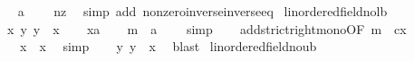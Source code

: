 \begin{isabellebody}
\ \ \isamarkupfalse%
\ {\isachardoublequoteopen}a\ {\isacharless}{\kern0pt}\ {}{\isachardoublequoteclose}\ \isamarkupfalse%
\ nz\ \isamarkupfalse%
\ {\isacharparenleft}{\kern0pt}simp\ add{\isacharcolon}{\kern0pt}\ nonzero{\isacharunderscore}{\kern0pt}inverse{\isacharunderscore}{\kern0pt}inverse{\isacharunderscore}{\kern0pt}eq{\isacharparenright}{\kern0pt}\isanewline
{}\isamarkupfalse%
%
\endisatagproof
{\isafoldproof}%
%
\isadelimproof
\isanewline
%
\endisadelimproof
\isanewline
{}\isamarkupfalse%
\ linordered{\isacharunderscore}{\kern0pt}field{\isacharunderscore}{\kern0pt}no{\isacharunderscore}{\kern0pt}lb{\isacharcolon}{\kern0pt}\isanewline
\ \ {\isachardoublequoteopen}{\isasymforall}x{\isachardot}{\kern0pt}\ {\isasymexists}y{\isachardot}{\kern0pt}\ y\ {\isacharless}{\kern0pt}\ x{\isachardoublequoteclose}\isanewline
%
\isadelimproof
%
\endisadelimproof
%
\isatagproof
{}\isamarkupfalse%
\isanewline
\ \ \isamarkupfalse%
\ x{\isacharcolon}{\kern0pt}{\isacharcolon}{\kern0pt}{\isacharprime}{\kern0pt}a\isanewline
\ \ \isamarkupfalse%
\ m{}{\isacharcolon}{\kern0pt}\ {\isachardoublequoteopen}{\isacharminus}{\kern0pt}\ {\isacharparenleft}{\kern0pt}{}{\isacharcolon}{\kern0pt}{\isacharcolon}{\kern0pt}{\isacharprime}{\kern0pt}a{\isacharparenright}{\kern0pt}\ {\isacharless}{\kern0pt}\ {}{\isachardoublequoteclose}\ \isamarkupfalse%
\ simp\isanewline
\ \ \isamarkupfalse%
\ add{\isacharunderscore}{\kern0pt}strict{\isacharunderscore}{\kern0pt}right{\isacharunderscore}{\kern0pt}mono{\isacharbrackleft}{\kern0pt}OF\ m{}{\isacharcomma}{\kern0pt}\ \ c{\isacharequal}{\kern0pt}x{\isacharbrackright}{\kern0pt}\isanewline
\ \ \isamarkupfalse%
\ {\isachardoublequoteopen}{\isacharparenleft}{\kern0pt}{\isacharminus}{\kern0pt}\ {}{\isacharparenright}{\kern0pt}\ {\isacharplus}{\kern0pt}\ x\ {\isacharless}{\kern0pt}\ x{\isachardoublequoteclose}\ \isamarkupfalse%
\ simp\isanewline
\ \ \isamarkupfalse%
\ {\isachardoublequoteopen}{\isasymexists}y{\isachardot}{\kern0pt}\ y\ {\isacharless}{\kern0pt}\ x{\isachardoublequoteclose}\ \isamarkupfalse%
\ blast\isanewline
{}\isamarkupfalse%
%
\endisatagproof
{\isafoldproof}%
%
\isadelimproof
\isanewline
%
\endisadelimproof
\isanewline
{}\isamarkupfalse%
\ linordered{\isacharunderscore}{\kern0pt}field{\isacharunderscore}{\kern0pt}no{\isacharunderscore}{\kern0pt}ub{\isacharcolon}{\kern0pt}\isanewline

\end{isabellebody}
